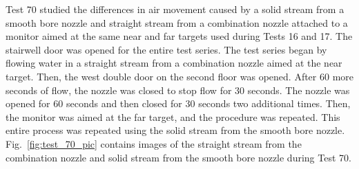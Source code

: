 \documentclass[12pt,oneside]{book}
\begin{document}
Test 70 studied the differences in air movement caused by a solid stream from a smooth bore nozzle and straight stream from a combination nozzle attached to a monitor aimed at the same near and far targets used during Tests 16 and 17. The stairwell door was opened for the entire test series. The test series began by flowing water in a straight stream from a combination nozzle aimed at the near target. Then, the west double door on the second floor was opened. After 60 more seconds of flow, the nozzle was closed to stop flow for 30 seconds. The nozzle was opened for 60 seconds and then closed for 30 seconds two additional times. Then, the monitor was aimed at the far target, and the procedure was repeated. This entire process was repeated using the solid stream from the smooth bore nozzle. Fig.~\ref{fig:test_70_pic} contains images of the straight stream from the combination nozzle and solid stream from the smooth bore nozzle during Test 70.
\end{document}
